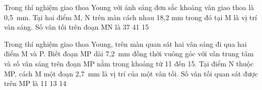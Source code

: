 \begin{vidu}%
Trong thí nghiệm giao thoa Young với ánh sáng đơn sắc khoảng vân giao thoa là 0,5\ mm. Tại hai điểm M, N trên màn cách nhau 18,2 mm trong đó tại M là vị trí vân sáng. Số vân tối trên đoạn MN là
\choice
{}
{37}
{41}
{15}
\end{vidu} %
\begin{vidu}%
Trong thí nghiệm giao thoa Young, trên màn quan sát hai vân sáng đi qua hai điểm M và P. Biết đoạn MP dài 7,2\ mm đồng thời vuông góc với vân trung tâm và số vân sáng trên đoạn MP nằm trong khoảng từ 11 đến 15. Tại điểm N thuộc MP, cách M một đoạn 2,7\ mm là vị trí của một vân tối. Số vân tối quan sát được trên MP là
\choice
{11}
{}
{13}
{14}
\end{vidu} %

